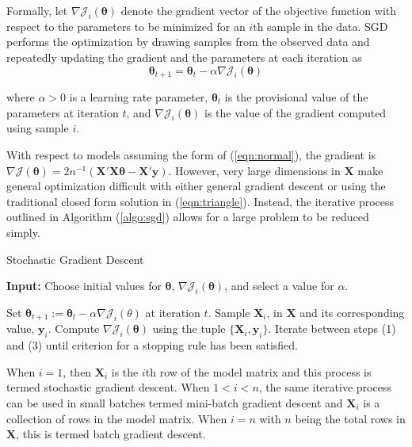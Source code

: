 \documentclass[12pt]{article}
\begin{document}
Formally, let $\nabla\mathcal{J}_i(\bm{\theta})$ denote the gradient vector of the objective function with respect to the parameters to be minimized for an $i$th sample in the data. SGD performs the optimization by drawing samples from the observed data and repeatedly updating the gradient and the parameters at each iteration as
\begin{equation}
\label{eqn:sgd}
\bm{\theta}_{t+1} = \bm{\theta}_t - \alpha \nabla\mathcal{J}_i(\bm{\theta})
\end{equation}

\noindent where $\alpha > 0$ is a learning rate parameter, $\bm{\theta}_t$ is the provisional value of the parameters at iteration $t$, and $\nabla\mathcal{J}_i(\bm{\theta})$ is the value of the gradient computed using sample $i$. 

With respect to models assuming the form of (\ref{eqn:normal}), the gradient is $\nabla\mathcal{J}(\bm{\theta}) = 2n^{-1}(\bm{X}'\bm{X}\bm{\theta}-\bm{X}'\bm{y})$. However, very large dimensions in $\bm{X}$ make general optimization difficult with either general gradient descent or using the traditional closed form solution in (\ref{eqn:triangle}). Instead, the iterative process outlined in Algorithm (\ref{algo:sgd}) allows for a large problem to be reduced simply. 

\begin{algorithm}
\caption{Stochastic Gradient Descent}
\label{algo:sgd}
	\hspace*{\algorithmicindent} \textbf{Input:} Choose initial values for $\bm{\theta}$, $\nabla\mathcal{J}_i(\bm{\theta})$, and select a value for $\alpha$.
\begin{algorithmic}[1]
	\State Set $\bm{\theta}_{t+1}:= \bm{\theta}_t - \alpha\nabla\mathcal{J}_i(\theta)$ at iteration $t$.
	\State Sample $\bm{X}_i$, in $\bm{X}$ and its corresponding value, $\bm{y}_i$.
	\State Compute $\nabla\mathcal{J}_i(\bm{\theta})$ using the tuple $\{\bm{X}_i, \bm{y}_i\}$.
	\State Iterate between steps (1) and (3) until criterion for a stopping rule has been satisfied. 
\end{algorithmic}
\end{algorithm}

When $i=1$, then $\bm{X}_i$ is the $i$th row of the model matrix and this process is termed stochastic gradient descent. When $1 < i < n$, the same iterative process can be used in small batches termed mini-batch gradient descent and $\bm{X}_i$ is a collection of rows in the model matrix. When $i=n$ with $n$ being the total rows in $\bm{X}$, this is termed batch gradient descent. 
\end{document}

